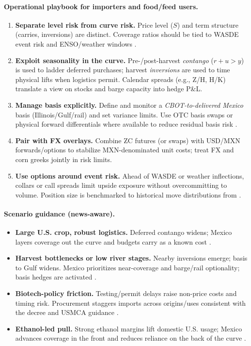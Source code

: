 \documentclass[10pt,a4paper]{article} %
\begin{document}
\paragraph{Operational playbook for importers and food/feed users.}
\begin{enumerate}
  \item \textbf{Separate level risk from curve risk.} Price level (\(S\)) and term structure (carries, inversions) are distinct. Coverage ratios should be tied to WASDE event risk and ENSO/weather windows \citep{noaa_enso_discussion,usda_wasde}.
  \item \textbf{Exploit seasonality in the curve.} Pre-/post-harvest \emph{contango} (\(r+u>y\)) is used to ladder deferred purchases; harvest \emph{inversions} are used to time physical lifts when logistics permit. Calendar spreads (e.g., Z/H, H/K) translate a view on stocks and barge capacity into hedge P\&L.
  \item \textbf{Manage basis explicitly.} Define and monitor a \emph{CBOT-to-delivered Mexico} basis (Illinois/Gulf/rail) and set variance limits. Use OTC basis swaps or physical forward differentials where available to reduce residual basis risk \citep{ams_gtr_2023}.
  \item \textbf{Pair with FX overlays.} Combine ZC futures (or swaps) with USD/MXN forwards/options to stabilize MXN-denominated unit costs; treat FX and corn greeks jointly in risk limits.
  \item \textbf{Use options around event risk.} Ahead of WASDE or weather inflections, collars or call spreads limit upside exposure without overcommitting to volume. Position size is benchmarked to historical move distributions from \citep{usda_wasde}.
\end{enumerate}

\paragraph{Scenario guidance (news-aware).}
\begin{itemize}
  \item \textbf{Large U.S. crop, robust logistics.} Deferred contango widens; Mexico layers coverage out the curve and budgets carry as a known cost \citep{ers_feedgrains_outlook,reuters_record_crop_2025}.
  \item \textbf{Harvest bottlenecks or low river stages.} Nearby inversions emerge; basis to Gulf widens. Mexico prioritizes near-coverage and barge/rail optionality; basis hedges are activated \citep{ams_gtr_2023}.
  \item \textbf{Biotech-policy friction.} Testing/permit delays raise non-price costs and timing risk. Procurement staggers imports across origins/uses consistent with the decree and USMCA guidance \citep{fas_mexico_decree_2023,ustr_usmca_biotech_win_2024,fas_mexico_grain_annual_2025}.
  \item \textbf{Ethanol-led pull.} Strong ethanol margins lift domestic U.S. usage; Mexico advances coverage in the front and reduces reliance on the back of the curve \citep{ers_ethanol_40}.
\end{itemize}
\end{document}
